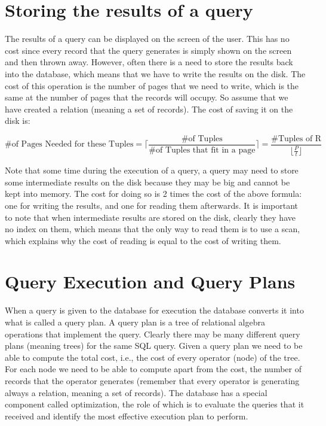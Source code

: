 \documentclass[11pt]{article}
\begin{document}
\section{Storing the results of a query}
The results of a query can be displayed on the screen of the user. This has no cost since every record that the query generates is simply shown on the screen and then thrown away. However, often there is a need to store the results back into the database, which means that we have to write the results on the disk. The cost of this operation is the number of pages that we need to write, which is the same at the number of pages that the records will occupy. So assume that we have created a relation (meaning a set of records). The cost of saving it on the disk is:

$$
\text{\# of Pages Needed for these Tuples} = \Big\lceil\frac{\text{\# of Tuples}}{\text{\# of Tuples that fit in a page}}\Big\rceil = \frac{\text{\#Tuples of R}}{\lfloor\frac{P}{t}\rfloor}
$$

Note that some time during the execution of a query, a query may need to store some intermediate results on the disk because they may be big and cannot be kept into memory. The cost for doing so is 2 times the cost of the above formula: one for writing the results, and one for reading them afterwards.
It is important to note that when intermediate results are stored on the disk, clearly they have no index on them, which means that the only way to read them is to use a scan, which explains why the cost of reading is equal to the cost of writing them.

\section{Query Execution and Query Plans}

When a query is given to the database for execution the database converts it into what is called a query plan. A query plan is a tree of relational algebra operations that implement the query. Clearly there may be many different query plans (meaning trees) for the same SQL query. Given a query plan we need to be able to compute the total cost, i.e., the cost of every operator (node) of the tree. For each node we need to be able to compute apart from the cost, the number of records that the operator generates (remember that every operator is generating always a relation, meaning a set of records).
The database has a special component called optimization, the role of which is to evaluate the queries that it received and identify the most effective execution plan to perform.
\end{document}
